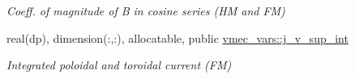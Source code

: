 \begin{DoxyCompactItemize}
\begin{DoxyCompactList}\small\item\em Coeff. of magnitude of B in cosine series (HM and FM) \end{DoxyCompactList}\item 
real(dp), dimension(\+:,\+:), allocatable, public \hyperlink{namespacevmec__vars_aa822a336e5823876fea884b07857389c}{vmec\+\_\+vars\+::j\+\_\+v\+\_\+sup\+\_\+int}
\begin{DoxyCompactList}\small\item\em Integrated poloidal and toroidal current (FM) \end{DoxyCompactList}\end{DoxyCompactItemize}
